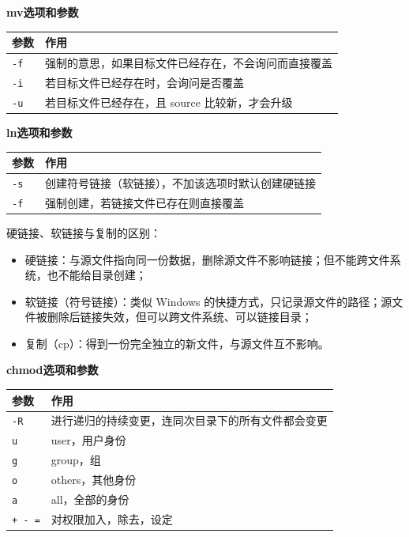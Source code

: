 \begin{table}[H]\centering
\textbf{mv\enspace 选项和参数}

	\begin{tabular}{p{}p{}}
		\toprule[1.5pt]
		参数 & 作用\\
		\midrule[1pt]
		\texttt{-f}		&强制的意思，如果目标文件已经存在，不会询问而直接覆盖\\
		\texttt{-i}		&若目标文件已经存在时，会询问是否覆盖\\
		\texttt{-u}		&若目标文件已经存在，且 source 比较新，才会升级 \\
		\bottomrule[1.5pt]
	\end{tabular}
\end{table}



\begin{table}[H]\centering
\textbf{ln\enspace 选项和参数}

	\begin{tabular}{p{}p{}}
		\toprule[1.5pt]
		参数 & 作用\\
		\midrule[1pt]
		\texttt{-s}		&创建符号链接（软链接），不加该选项时默认创建硬链接\\
		\texttt{-f}		&强制创建，若链接文件已存在则直接覆盖\\
		\bottomrule[1.5pt]
	\end{tabular}
\end{table}


\begin{conclusion}
硬链接、软链接与复制的区别：

\begin{itemize}
\item 硬链接：与源文件指向同一份数据，删除源文件不影响链接；但不能跨文件系统，也不能给目录创建；
\item 软链接（符号链接）：类似 Windows 的快捷方式，只记录源文件的路径；源文件被删除后链接失效，但可以跨文件系统、可以链接目录；
\item 复制（cp）：得到一份完全独立的新文件，与源文件互不影响。
\end{itemize}
\end{conclusion}


\begin{table}[H]\centering
\textbf{chmod\enspace 选项和参数}

	\begin{tabular}{p{}p{}}
		\toprule[1.5pt]
		参数 & 作用\\
		\midrule[1pt]
		\texttt{-R}		&进行递归的持续变更，连同次目录下的所有文件都会变更\\
		\texttt{u}		&user，用户身份\\
		\texttt{g}		&group，组 \\
		\texttt{o}		&others，其他身份 \\
		\texttt{a}		&all，全部的身份 \\
		\texttt{+  -  =}		&对权限加入，除去，设定 \\
		\bottomrule[1.5pt]
	\end{tabular}
\end{table}


